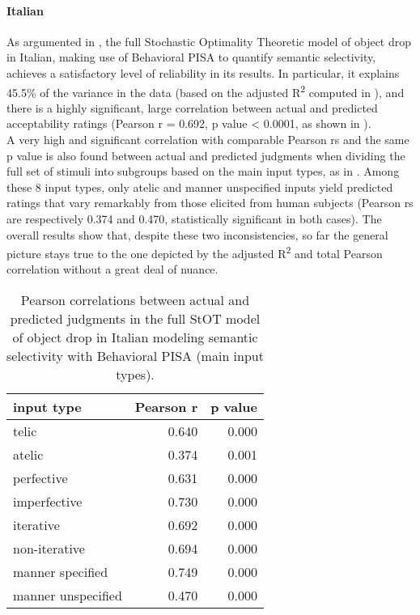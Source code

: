 \paragraph{Italian} 
As argumented in , the full Stochastic Optimality Theoretic model of object drop in Italian, making use of Behavioral PISA to quantify semantic selectivity, achieves a satisfactory level of reliability in its results. In particular, it explains 45.5\% of the variance in the data (based on the adjusted R\textsuperscript{2} computed in ), and there is a highly significant, large correlation between actual and predicted acceptability ratings (Pearson r = 0.692, p value < 0.0001, as shown in ).\\
A very high and significant correlation with comparable Pearson rs and the same p value is also found between actual and predicted judgments when dividing the full set of stimuli into subgroups based on the main input types, as in . Among these 8 input types, only atelic and manner unspecified inputs yield predicted ratings that vary remarkably from those elicited from human subjects (Pearson rs are respectively 0.374 and 0.470, statistically significant in both cases). The overall results show that, despite these two inconsistencies, so far the general picture stays true to the one depicted by the adjusted R\textsuperscript{2} and total Pearson correlation without a great deal of nuance.

\begin{table}[htb] %
\caption{Pearson correlations between actual and predicted judgments in the full StOT model of object drop in Italian modeling semantic selectivity with Behavioral PISA (main input types).}
\begin{tabular}{l|rr}
\textbf{input type} & \textbf{Pearson r} & \textbf{p value} \\
\hline
telic               & 0.640 & 0.000 \\
atelic              & 0.374 & 0.001 \\
perfective          & 0.631 & 0.000 \\
imperfective        & 0.730 & 0.000 \\
iterative           & 0.692 & 0.000 \\
non-iterative       & 0.694 & 0.000 \\
manner specified    & 0.749 & 0.000 \\
manner unspecified  & 0.470 & 0.000
\end{tabular}
\end{table}

